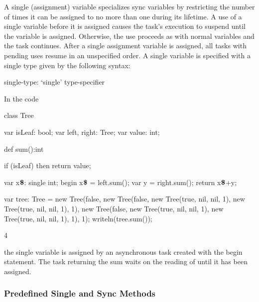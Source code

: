 A single (assignment) variable specializes sync variables by
restricting the number of times it can be assigned to no more than one
during its lifetime.  A use of a single variable before it is assigned
causes the task's execution to suspend until the variable is assigned.
Otherwise, the use proceeds as with normal variables and the task
continues.  After a single assignment variable is assigned, all tasks
with pending uses resume in an unspecified order.  A single variable
is specified with a single type given by the following syntax:
\begin{syntax}
single-type:
  `single' type-specifier
\end{syntax}

\begin{example}
In the code
\begin{chapelpre}
\end{chapelpre}
\begin{chapel}
class Tree {
  var isLeaf: bool;
  var left, right: Tree;
  var value: int;

  def sum():int {
    if (isLeaf) then 
       return value;

    var x$\mbox{{\bf \$}}$: single int;
    begin x$\mbox{{\bf \$}}$ = left.sum();
    var y = right.sum();
    return x$\mbox{{\bf \$}}$+y;
  }
}
\end{chapel}
\begin{chapelpost}
var tree: Tree = new Tree(false, new Tree(false, new Tree(true, nil, nil, 1),
                                                 new Tree(true, nil, nil, 1), 1),
                                 new Tree(false, new Tree(true, nil, nil, 1),
                                                 new Tree(true, nil, nil, 1), 1), 1);
writeln(tree.sum());
\end{chapelpost}
\begin{chapeloutput}
4
\end{chapeloutput}
the single variable  is assigned by an
asynchronous task created with the begin statement.  The task
returning the sum waits on the reading of 
until it has been assigned.
\end{example}

\subsubsection{Predefined Single and Sync Methods}
\label{Functions_on_Synchronization_Variables}

